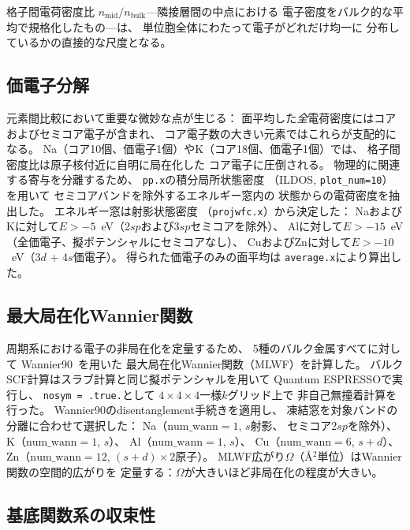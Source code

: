 \documentclass[twocolumn,showpacs,preprintnumbers,amsmath,amssymb,prb]{revtex4-2}
\begin{document}
格子間電荷密度比
$n_\mathrm{mid}/n_\mathrm{bulk}$---隣接層間の中点における
電子密度をバルク的な平均で規格化したもの---は、
単位胞全体にわたって電子がどれだけ均一に
分布しているかの直接的な尺度となる。

\subsection{価電子分解}

元素間比較において重要な微妙な点が生じる：
面平均した\emph{全}電荷密度にはコアおよびセミコア電子が含まれ、
コア電子数の大きい元素ではこれらが支配的になる。
Na（コア10個、価電子1個）やK（コア18個、価電子1個）では、
格子間密度比は原子核付近に自明に局在化した
コア電子に圧倒される。
物理的に関連する寄与を分離するため、
\texttt{pp.x}の積分局所状態密度
（ILDOS, \texttt{plot\_num=10}）を用いて
セミコアバンドを除外するエネルギー窓内の
状態からの電荷密度を抽出した。
エネルギー窓は射影状態密度
（\texttt{projwfc.x}）から決定した：
NaおよびKに対して$E > -5$~eV（2$sp$および3$sp$セミコアを除外）、
Alに対して$E > -15$~eV（全価電子、擬ポテンシャルにセミコアなし）、
CuおよびZnに対して$E > -10$~eV（3$d$ + 4$s$価電子）。
得られた価電子のみの面平均は
\texttt{average.x}により算出した。

\subsection{最大局在化Wannier関数}

周期系における電子の非局在化を定量するため、
5種のバルク金属すべてに対して
Wannier90~\cite{Pizzi2020}を用いた
最大局在化Wannier関数（MLWF）を計算した。
バルクSCF計算はスラブ計算と同じ擬ポテンシャルを用いて
Quantum ESPRESSOで実行し、
\texttt{nosym = .true.}として
$4 \times 4 \times 4$一様$k$グリッド上で
非自己無撞着計算を行った。
Wannier90のdisentanglement手続きを適用し、
凍結窓を対象バンドの分離に合わせて選択した：
Na（$\mathrm{num\_wann} = 1$, $s$射影、
セミコア2$sp$を除外）、K（$\mathrm{num\_wann} = 1$, $s$）、
Al（$\mathrm{num\_wann} = 1$, $s$）、
Cu（$\mathrm{num\_wann} = 6$, $s + d$）、
Zn（$\mathrm{num\_wann} = 12$, $(s + d) \times 2$原子）。
MLWF広がり$\Omega$（\AA$^2$単位）はWannier関数の空間的広がりを
定量する：$\Omega$が大きいほど非局在化の程度が大きい。

\subsection{基底関数系の収束性}
\label{sec:basis_convergence}
\end{document}
